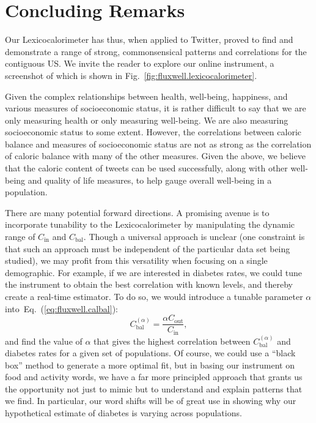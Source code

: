 \documentclass[10pt]{article}
\newcommand{\Req}[1]{Eq.~(\ref{#1})}
\newcommand{\calin}{C_{\textrm{in}}}
\newcommand{\calout}{C_{\textrm{out}}}
\newcommand{\calbal}{C_{\textrm{bal}}}
\begin{document}
\section*{Concluding Remarks}
\label{sec:fluxwell.conclusion}

Our Lexicocalorimeter
has thus, when applied to Twitter,
proved to find and demonstrate 
a range of strong, commonsensical 
patterns and correlations for the contiguous US.
We invite the reader to explore our online instrument,
a screenshot of which is shown in Fig.~\ref{fig:fluxwell.lexicocalorimeter}.

Given the complex relationships between health,
well-being, happiness, and various measures of socioeconomic status,
it is rather difficult to say that we are only measuring health or
only measuring well-being.  We are also measuring socioeconomic
status to some extent.  However, the correlations between caloric
balance and measures of socioeconomic status are not as strong as the
correlation of caloric balance with many of the other measures.
Given the above, we believe that the caloric content of
tweets can be used successfully, along with other well-being and
quality of life measures, to help gauge overall well-being in a population.

There are many potential forward directions.
A promising avenue is to incorporate tunability to
the Lexicocalorimeter by manipulating the dynamic
range of $\calin$ and $\calbal$. 
Though a universal approach is unclear 
(one constraint is that such an approach must be independent of the particular data set being studied),
we may profit from this versatility when
focusing on a single demographic.
For example, if we are interested in diabetes rates,
we could tune the instrument to obtain the best correlation
with known levels, and thereby create a real-time
estimator.  
To do so, we would introduce a tunable parameter $\alpha$
into~\Req{eq:fluxwell.calbal}:
\begin{equation}
  \calbal^{(\alpha)}
  = 
  \frac{\alpha\calout}{\calin},
  \label{eq:fluxwell.calbalalpha}
\end{equation}
and find the value of $\alpha$ that gives the highest
correlation between $\calbal^{(\alpha)}$ and diabetes
rates for a given set of populations.
Of course, we could use a ``black box'' method to generate
a more optimal fit, but in basing our instrument on food and activity
words, we have a far more principled approach that grants us
the opportunity not just to mimic but to understand and explain patterns that we find.
In particular, our word shifts will be of great use in showing why
our hypothetical estimate of diabetes is varying across populations.
\end{document}

